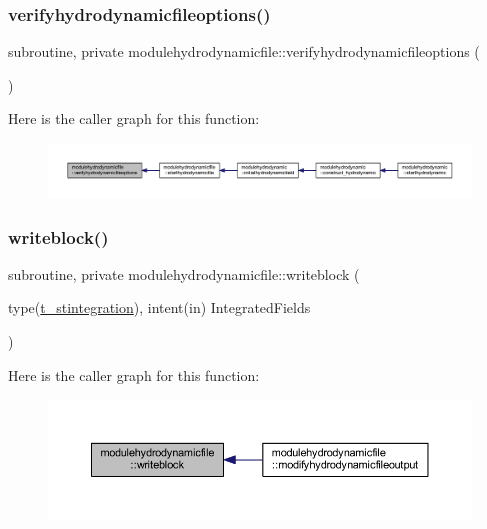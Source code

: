 \subsubsection{\texorpdfstring{verifyhydrodynamicfileoptions()}{verifyhydrodynamicfileoptions()}}
{\footnotesize\ttfamily subroutine, private modulehydrodynamicfile\+::verifyhydrodynamicfileoptions (\begin{DoxyParamCaption}{ }\end{DoxyParamCaption})\hspace{0.3cm}{\ttfamily [private]}}

Here is the caller graph for this function\+:\nopagebreak
\begin{figure}[H]
\begin{center}
\leavevmode
\includegraphics[width=350pt]{namespacemodulehydrodynamicfile_acd3245c0ac200350cf4d9bd623090e6b_icgraph}
\end{center}
\end{figure}
\mbox{\label{namespacemodulehydrodynamicfile_a3dc8b494b31e0a9504668b6e7dc8eaa6}} 
\subsubsection{\texorpdfstring{writeblock()}{writeblock()}}
{\footnotesize\ttfamily subroutine, private modulehydrodynamicfile\+::writeblock (\begin{DoxyParamCaption}\item[{type(\mbox{\hyperlink{structmodulehydrodynamicfile_1_1t__stintegration}{t\+\_\+stintegration}}), intent(in)}]{Integrated\+Fields }\end{DoxyParamCaption})\hspace{0.3cm}{\ttfamily [private]}}

Here is the caller graph for this function\+:\nopagebreak
\begin{figure}[H]
\begin{center}
\leavevmode
\includegraphics[width=350pt]{namespacemodulehydrodynamicfile_a3dc8b494b31e0a9504668b6e7dc8eaa6_icgraph}
\end{center}
\end{figure}
\mbox{\label{namespacemodulehydrodynamicfile_ad777d9126fa56a82299811343a399ea8}} 
